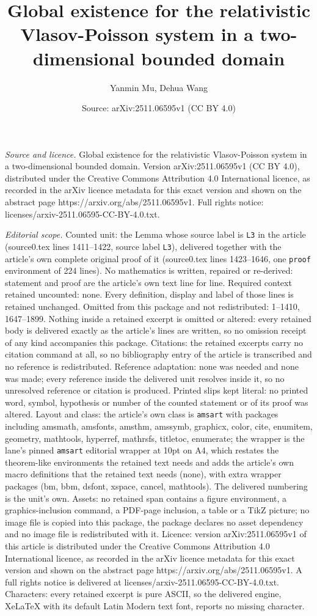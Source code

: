 \documentclass[10pt,a4paper]{amsart}
\title[Global existence for the relativistic Vlasov-Poisson system ]{Global existence for the relativistic Vlasov-Poisson system in a two-dimensional bounded domain}
\author{Yanmin Mu, Dehua Wang}
\date{Source: arXiv:2511.06595v1 (CC BY 4.0)}
\begin{document}
\maketitle

\noindent\emph{Source and licence.} Global existence for the relativistic Vlasov-Poisson system in a two-dimensional bounded domain. Version arXiv:2511.06595v1 (CC BY 4.0), distributed under the Creative Commons Attribution 4.0 International licence, as recorded in the arXiv licence metadata for this exact version and shown on the abstract page https://arxiv.org/abs/2511.06595v1. Full rights notice: licenses/arxiv-2511.06595-CC-BY-4.0.txt.\par\smallskip

\noindent\textit{Editorial scope.} Counted unit: the Lemma whose source label is \texttt{L3} in the article (source0.tex lines 1411--1422, source label \texttt{L3}), delivered together with the article's own complete original proof of it (source0.tex lines 1423--1646, one \texttt{proof} environment of 224 lines). No mathematics is written, repaired or re-derived: statement and proof are the article's own text line for line. Required context retained uncounted: none. Every definition, display and label of those lines is retained unchanged. Omitted from this package and not redistributed: 1--1410, 1647--1899. Nothing inside a retained excerpt is omitted or altered: every retained body is delivered exactly as the article's lines are written, so no omission receipt of any kind accompanies this package. Citations: the retained excerpts carry no citation command at all, so no bibliography entry of the article is transcribed and no reference is redistributed. Reference adaptation: none was needed and none was made; every reference inside the delivered unit resolves inside it, so no unresolved reference or citation is produced. Printed slips kept literal: no printed word, symbol, hypothesis or number of the counted statement or of its proof was altered. Layout and class: the article's own class is \texttt{amsart} with packages including amsmath, amsfonts, amsthm, amssymb, graphicx, color, cite, enumitem, geometry, mathtools, hyperref, mathrsfs, titletoc, enumerate; the wrapper is the lane's pinned \texttt{amsart} editorial wrapper at 10pt on A4, which restates the theorem-like environments the retained text needs and adds the article's own macro definitions that the retained text needs (none), with extra wrapper packages (bm, bbm, dsfont, xspace, cancel, mathtools). The delivered numbering is the unit's own. Assets: no retained span contains a figure environment, a graphics-inclusion command, a PDF-page inclusion, a table or a TikZ picture; no image file is copied into this package, the package declares no asset dependency and no image file is redistributed with it. Licence: version arXiv:2511.06595v1 of this article is distributed under the Creative Commons Attribution 4.0 International licence, as recorded in the arXiv licence metadata for this exact version and shown on the abstract page https://arxiv.org/abs/2511.06595v1. A full rights notice is delivered at licenses/arxiv-2511.06595-CC-BY-4.0.txt. Characters: every retained excerpt is pure ASCII, so the delivered engine, XeLaTeX with its default Latin Modern text font, reports no missing character.
\end{document}
